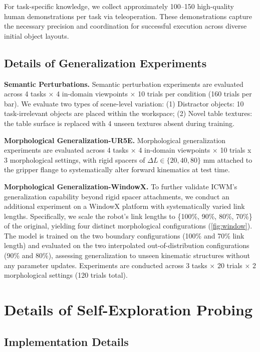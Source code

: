For task-specific knowledge, we collect approximately 100–150 high-quality human demonstrations per task via teleoperation. These demonstrations capture the necessary precision and coordination for successful execution across diverse initial object layouts.






\subsection{Details of Generalization Experiments}
\label{app:gen}
\textbf{Semantic Perturbations.} 
Semantic perturbation experiments are evaluated across 4 tasks × 4 in-domain viewpoints × 10 trials per condition (160 trials per bar). We evaluate two types of scene-level variation: (1) Distractor objects: 10 task-irrelevant objects are placed within the workspace; (2) Novel table textures: the table surface is replaced with 4 unseen textures absent during training. 


\textbf{Morphological Generalization-UR5E.} 
Morphological generalization experiments are evaluated across 4 tasks × 4 in-domain viewpoints × 10 trials x 3 morphological settings, with rigid spacers of $\Delta L \in \{20, 40, 80\}$ mm attached to the gripper flange to systematically alter forward kinematics at test time.


\textbf{Morphological Generalization-WindowX.} 
\label{app:morph_windowx}
To further validate ICWM's generalization capability beyond rigid spacer attachments, we conduct an additional experiment on a WindowX platform with systematically varied link lengths. Specifically, we scale the robot's link lengths to \{100\%, 90\%, 80\%, 70\%\} of the original, yielding four distinct morphological configurations (\autoref{fig:window}). 
The model is trained on the two boundary configurations (100\% and 70\% link length) and evaluated on the two interpolated out-of-distribution configurations (90\% and 80\%), assessing generalization to unseen kinematic structures without any parameter updates. Experiments are conducted across 3 tasks $\times$ 20 trials $\times$ 2 morphological settings (120 trials total).




\section{Details of Self-Exploration Probing}
\label{app:random}
\subsection{Implementation Details}




